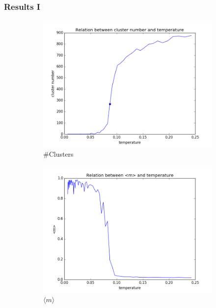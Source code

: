 \documentclass{beamer}
\begin{document}
\begin{frame}[fragile]
\frametitle{Results I}
\begin{figure}
\captionsetup[subfigure]{labelformat=empty}
\centering
\begin{subfigure}{0.45\textwidth}
  \centering
  \includegraphics[width=.8\linewidth]{fig/cluster_num.png}
  \caption{\#Clusters}%
  \label{fig:cluster_num}
\end{subfigure}
\hspace*{\fill}
\begin{subfigure}{0.45\textwidth}
  \centering
  \includegraphics[width=.8\linewidth]{fig/magnetization.png}
  \caption{$\langle m \rangle$}%
  \label{fig:magnetization}
\end{subfigure}
\begin{subfigure}{0.45\textwidth}
  \centering
  

\end{subfigure}
\end{figure}
\end{frame}
\end{document}

